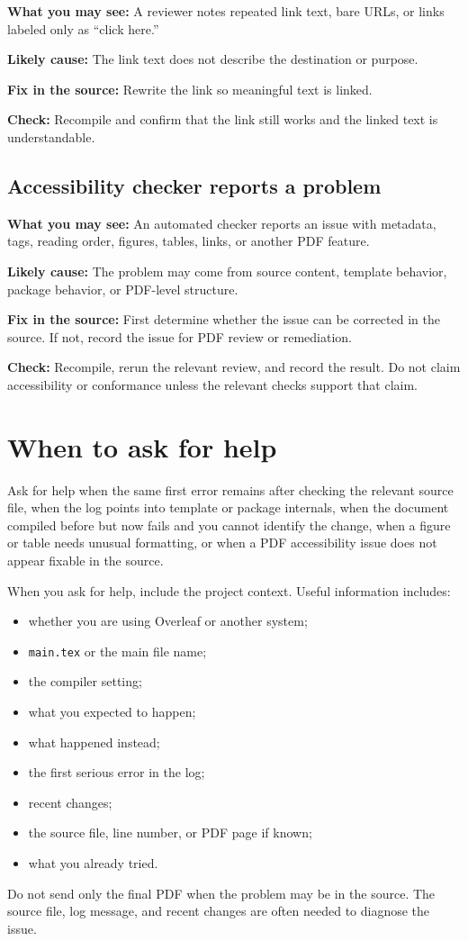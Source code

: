 \textbf{What you may see:} A reviewer notes repeated link text, bare URLs, or links labeled only as ``click here.''

\textbf{Likely cause:} The link text does not describe the destination or purpose.

\textbf{Fix in the source:} Rewrite the link so meaningful text is linked.

\textbf{Check:} Recompile and confirm that the link still works and the linked text is understandable.

\subsection{Accessibility checker reports a problem}
\label{subsec:checker-reports-problem}

\textbf{What you may see:} An automated checker reports an issue with metadata, tags, reading order, figures, tables, links, or another PDF feature.

\textbf{Likely cause:} The problem may come from source content, template behavior, package behavior, or PDF-level structure.

\textbf{Fix in the source:} First determine whether the issue can be corrected in the source. If not, record the issue for PDF review or remediation.

\textbf{Check:} Recompile, rerun the relevant review, and record the result. Do not claim accessibility or conformance unless the relevant checks support that claim.

\section{When to ask for help}
\label{sec:when-to-ask-for-help}

Ask for help when the same first error remains after checking the relevant source file, when the log points into template or package internals, when the document compiled before but now fails and you cannot identify the change, when a figure or table needs unusual formatting, or when a PDF accessibility issue does not appear fixable in the source.

When you ask for help, include the project context. Useful information includes:

\begin{itemize}
  \item whether you are using Overleaf or another system;
  \item \texttt{main.tex} or the main file name;
  \item the compiler setting;
  \item what you expected to happen;
  \item what happened instead;
  \item the first serious error in the log;
  \item recent changes;
  \item the source file, line number, or PDF page if known;
  \item what you already tried.
\end{itemize}

Do not send only the final PDF when the problem may be in the source. The source file, log message, and recent changes are often needed to diagnose the issue.
